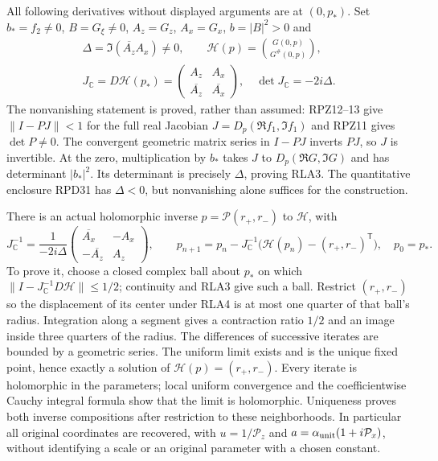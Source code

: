 \documentclass[11pt]{article}
\begin{document}
All following derivatives without displayed arguments are at $(0,p_*)$.
Set $b_*=f_2\ne0$, $B=G_\xi\ne0$, $A_z=G_z$, $A_x=G_x$,
$b=|B|^2>0$ and
\[
 \begin{gathered}\Delta=\Im(\overline{A_z}A_x)\ne0,\qquad
 \mathcal H(p)=\binom{G(0,p)}{G^\#(0,p)},\\
 J_{\mathbb C}=D\mathcal H(p_*)=
 \begin{pmatrix}A_z&A_x\\\overline{A_z}&\overline{A_x}\end{pmatrix},
 \quad\det J_{\mathbb C}=-2i\Delta.
 \end{gathered}\tag{RLA3}
\]
The nonvanishing statement is proved, rather than assumed: RPZ12--13
give $\|I-PJ\|<1$ for the full real Jacobian
$J=D_p(\Re f_1,\Im f_1)$ and RPZ11 gives $\det P\ne0$.
The convergent geometric matrix series in $I-PJ$ inverts $PJ$,
so $J$ is invertible.  At the zero, multiplication by $b_*$ takes
$J$ to $D_p(\Re G,\Im G)$ and has determinant $|b_*|^2$.
Its determinant is precisely $\Delta$, proving RLA3.
The quantitative enclosure RPD31 has $\Delta<0$, but nonvanishing
alone suffices for the construction.

There is an actual holomorphic inverse $p=\mathcal P(r_+,r_-)$ to
$\mathcal H$, with
\[
 J_{\mathbb C}^{-1}
 =\frac1{-2i\Delta}
 \begin{pmatrix}\overline{A_x}&-A_x\\-\overline{A_z}&A_z\end{pmatrix},
 \qquad
 p_{n+1}=p_n-J_{\mathbb C}^{-1}
              \bigl(\mathcal H(p_n)-(r_+,r_-)^{\mathsf T}\bigr),
 \quad p_0=p_*.
 \tag{RLA4}
\]
To prove it, choose a closed complex ball about $p_*$ on which
$\|I-J_{\mathbb C}^{-1}D\mathcal H\|\le1/2$; continuity and RLA3
give such a ball.  Restrict $(r_+,r_-)$ so the displacement of its
center under RLA4 is at most one quarter of that ball's radius.
Integration along a segment gives a contraction ratio $1/2$ and
an image inside three quarters of the radius.  The differences of
successive iterates are bounded by a geometric series.  The uniform
limit exists and is the unique fixed point, hence exactly a solution
of $\mathcal H(p)=(r_+,r_-)$.
Every iterate is holomorphic in the parameters; local uniform
convergence and the coefficientwise Cauchy integral formula show that
the limit is holomorphic.  Uniqueness proves both inverse compositions
after restriction to these neighborhoods.  In particular all original
coordinates are recovered, with $u=1/\mathcal P_z$ and
$a=\alpha_{\rm unit}(1+i\mathcal P_x)$, without identifying a scale
or an original parameter with a chosen constant.
\end{document}
